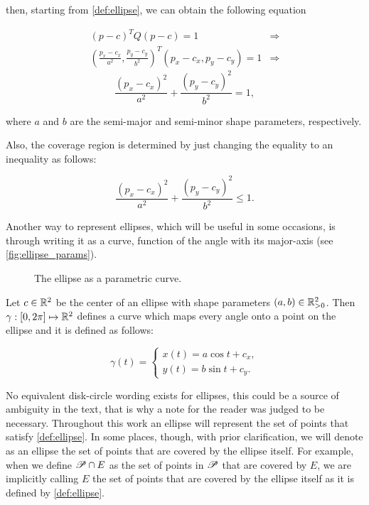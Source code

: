\noindent then, starting from \autoref{def:ellipse}, we can obtain the following equation

\begin{align*}
        (p-c)^{T}Q(p-c) = 1 & \Rightarrow \\
    (\frac{p_x-c_x}{a^2}, \frac{p_y-c_y}{b^2})^{T}(p_x-c_x, p_y-c_y) = 1 & \Rightarrow
 \end{align*}
 \begin{equation}\label{equation:pellipse}
  \frac{(p_x-c_x)^2}{a^2} + \frac{(p_y-c_y)^2}{b^2} = 1,
 \end{equation}

\noindent where $a$ and $b$ are the semi-major and semi-minor shape parameters, respectively.

Also, the coverage region is determined by just changing the equality to an inequality as follows:

\begin{equation}\label{equation:cover_pellipse}
\frac{(p_x-c_x)^2}{a^2} + \frac{(p_y-c_y)^2}{b^2} \le 1.
\end{equation}

Another way to represent ellipses, which will be useful in some occasions, is through writing it as a curve, function of the angle with its major-axis (see \autoref{fig:ellipse_params}).

\begin{figure}[H]
    \centering
    
    \caption{The ellipse as a parametric curve.}
    
    \fautor
    \label{fig:ellipse_params}
\end{figure}

Let $c \in \mathbb{R}^2$ be the center of an ellipse with shape parameters $(a,b) \in \mathbb{R}^2_{>0}$. Then $\gamma : [0, 2\pi] \mapsto \mathbb{R}^2$ defines a curve which maps every angle onto a point on the ellipse and it is defined as follows:

    \begin{equation}\label{eq:parametric_ellipse}
    \gamma(t) = \left\{
    \begin{array}{l}
    x(t)= a\cos{t} + c_x,\\
    y(t)=b\sin{t} + c_y.
    \end{array}
    \right.
    \end{equation}

No equivalent disk-circle wording exists for ellipses, this could be a source of ambiguity in the text, that is why a note for the reader was judged to be necessary. Throughout this work an ellipse will represent the set of points that satisfy \autoref{def:ellipse}. In some places, though, with prior clarification, we will denote as an ellipse the set of points that are covered by the ellipse itself. For example, when we define $\mathscr{P} \cap E$ as the set of points in $\mathscr{P}$ that are covered by $E$, we are implicitly calling $E$ the set of points that are covered by the ellipse itself as it is defined by \autoref{def:ellipse}.

